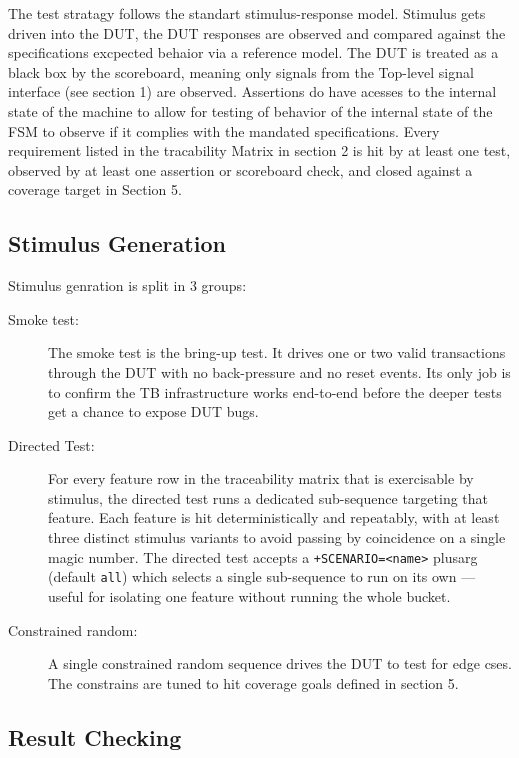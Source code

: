 \documentclass[11pt,a4paper]{article}
\begin{document}
The test stratagy follows the standart stimulus-response model. Stimulus gets driven into the DUT, the DUT responses are observed and compared against the specifications excpected behaior via a reference model. The DUT is treated as a black box by the scoreboard, meaning only signals from the Top-level signal interface (see section 1) are observed. Assertions do have acesses to the internal state of the machine to allow for testing of behavior of the  internal state of the FSM to observe if it complies with the mandated specifications. 
\newline
Every requirement listed in the tracability Matrix in section 2 is hit by at least one test, observed by at least one assertion or scoreboard check, and closed against a coverage target in Section 5.

 \subsection{Stimulus Generation}

Stimulus genration is split in 3 groups:

\begin{description}
    \item[Smoke test:] The smoke test is the bring-up test. It drives one or two valid transactions through the DUT with no back-pressure and no reset events. Its only job is to confirm the TB infrastructure works end-to-end before the deeper tests get a chance to expose DUT bugs.

    \item[Directed Test:] For every feature row in the traceability matrix that is exercisable by stimulus, the directed test runs a dedicated sub-sequence targeting that feature. Each feature is hit deterministically and repeatably, with at least three distinct stimulus variants  to avoid passing by coincidence on a single magic number. The directed test accepts a \texttt{+SCENARIO=<name>} plusarg (default \texttt{all}) which selects a single sub-sequence to run on its own --- useful for isolating one feature without running the whole bucket.

    \item[Constrained random:] A single constrained random sequence drives the DUT to test for edge cses. The constrains are tuned to hit coverage goals defined in section 5.
\end{description}


 \subsection{Result Checking}
\end{document}
